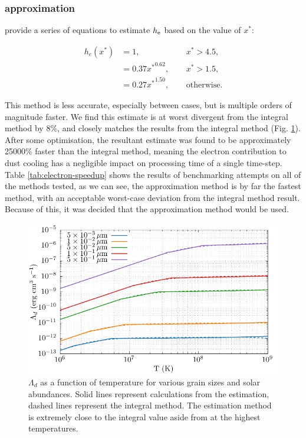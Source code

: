 \subsubsection{\textcite{dwek_infrared_1981} approximation}

\textcite{dwek_infrared_1981} provide a series of equations to estimate $h_\text{e}$ based on the value of $x^*$:

\begin{equation}
  \begin{alignedat}{3}
    h_e(x^*) & = 1 ,                && ~~ x^* > 4.5, \\
    & = 0.37{x^*}^{0.62} , && ~~ x^* > 1.5 , \\
    & = 0.27{x^*}^{1.50} , && ~~ \text{otherwise.}
  \end{alignedat} \label{eq:electrontransparencyestimate}
\end{equation}

\noindent
This method is less accurate, especially between cases, but is multiple orders of magnitude faster.
We find this estimate is at worst divergent from the integral method by $8\%$, and closely matches the results from the integral method (Fig. \ref{fig:lambda-comp-int-vs-est}).
After some optimisation, the resultant estimate was found to be approximately \num{25000}\% faster than the integral method, meaning the electron contribution to dust cooling has a negligible impact on processing time of a single time-step.
Table \ref{tab:electron-speedup} shows the results of benchmarking attempts on all of the methods tested, as we can see, the approximation method is by far the fastest method, with an acceptable worst-case deviation from the integral method result.
Because of this, it was decided that the approximation method would be used.

\begin{figure}[ht]
  \centering
  \includegraphics{assets/grain-transparency/lambda-comp.pdf}
  \caption[Electron transparency method accuracy - $\Lambda_d$]{$\Lambda_d$ as a function of temperature for various grain sizes and solar abundances. Solid lines represent calculations from the \textcite{dwek_infrared_1981} estimation, dashed lines represent the integral method. The estimation method is extremely close to the integral value aside from at the highest temperatures.}
  \label{fig:lambda-comp-int-vs-est}
\end{figure}

